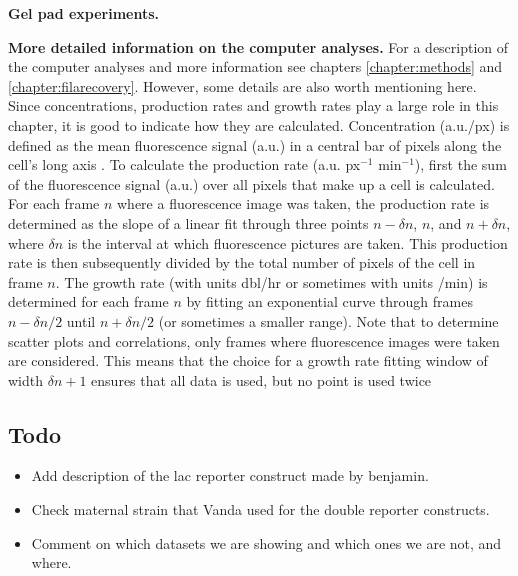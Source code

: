 \textbf{Gel pad experiments.} 

\textbf{More detailed information on the computer analyses.} 
For a description of the computer analyses and more information see chapters \ref{chapter:methods} and \ref{chapter:filarecovery}.
However, some details are also worth mentioning here. 
Since concentrations, production rates and growth rates play a large role in this chapter, it is good to indicate how they are calculated.
Concentration (a.u./px) is defined as the mean fluorescence signal (a.u.) in a central bar of pixels along the cell's long axis \cite{Kiviet2010}.
%
To calculate the production rate (a.u. px$^{-1}$ min$^{-1}$), first the sum of the fluorescence signal (a.u.) over all pixels that make up a cell is calculated. 
For each frame $n$ where a fluorescence image was taken, the production rate is determined as the slope of a linear fit through three points $n-\delta{n}$, $n$, and $n+\delta{n}$, where $\delta{n}$ is the interval at which fluorescence pictures are taken. This production rate is then subsequently divided by the total number of pixels of the cell in frame $n$.
The growth rate (with units dbl/hr or sometimes with units /min) is determined for each frame $n$ by fitting an exponential curve through frames $n-\delta{n}/2$ until $n+\delta{n}/2$ (or sometimes a smaller range).
Note that to determine scatter plots and correlations, only frames where fluorescence images were taken are considered.
This means that the choice for a growth rate fitting window of width $\delta{n}+1$ ensures that all data is used, but no point is used twice

\subsection*{Todo}

\begin{itemize}
	\item Add description of the lac reporter construct made by benjamin.
	\item Check maternal strain that Vanda used for the double reporter constructs.
	\item Comment on which datasets we are showing and which ones we are not, and where.
\end{itemize}


